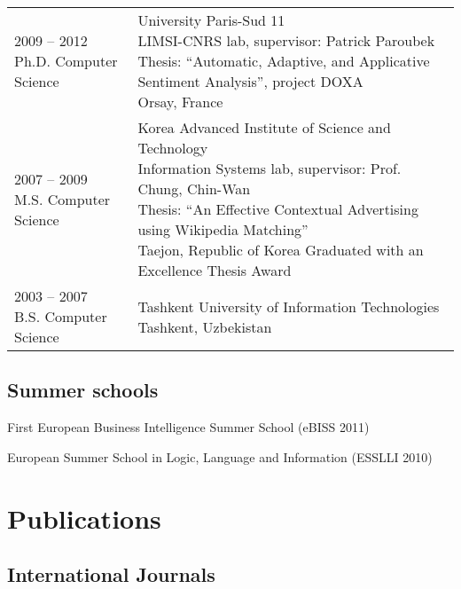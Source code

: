 \documentclass[letterpaper]{article}
\renewenvironment{itemize}{
  \begin{list}{}{
    \setlength{\leftmargin}{0.6em}
  }
}{
  \end{list}
}
\begin{document}
\begin{table}[h]
	\begin{tabular}{ll}
	\parbox[t]{5cm}{
		2009 -- 2012 \\
		Ph.D. Computer Science
	} &
	\parbox[t]{15cm}{
    	University Paris-Sud 11\\
		LIMSI-CNRS lab, supervisor: Patrick Paroubek\\
		Thesis: ``Automatic, Adaptive, and Applicative Sentiment Analysis'', project DOXA\\
		Orsay, France
		\vspace{1em}
    } \\
	\parbox[t]{5cm}{
		2007 -- 2009 \\
		M.S. Computer Science
	} &
	\parbox[t]{15cm}{
		Korea Advanced Institute of Science and Technology\\
		Information Systems lab, supervisor: Prof. Chung, Chin-Wan \\
		Thesis: ``An Effective Contextual Advertising using Wikipedia Matching''\\
		Taejon, Republic of Korea
        Graduated with an Excellence Thesis Award
		\vspace{1em}
    } \\
    \parbox[t]{5cm}{
		2003 -- 2007 \\
		B.S. Computer Science
	} &
	\parbox[t]{15cm}{
		Tashkent University of Information Technologies\\
		Tashkent, Uzbekistan
    } \\    
    \end{tabular}
\end{table}

\subsection*{Summer schools}
\begin{itemize}
\item First European Business Intelligence Summer School (eBISS 2011)
\item European Summer School in Logic, Language and Information (ESSLLI 2010)
\end{itemize}

\section*{Publications}

\subsection*{International Journals}
\end{document}
